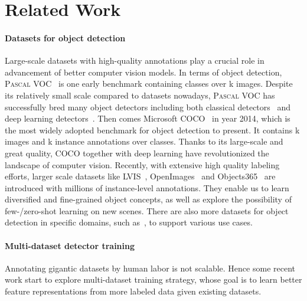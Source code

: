 \documentclass[10pt,twocolumn,letterpaper]{article}
\begin{document}
 
\section{Related Work}
\label{sec:related}
\paragraph{Datasets for object detection}
Large-scale datasets with high-quality annotations play a crucial role in advancement of better computer vision models. 
In terms of object detection, \textsc{Pascal} VOC~\cite{everingham2015pascal} is one early benchmark containing  classes over k images.
Despite its relatively small scale compared to datasets nowadays, \textsc{Pascal} VOC has successfully bred many object detectors including both classical detectors~\cite{felzenszwalb2009object, wang2013regionlets} and deep learning detectors~\cite{girshick2014rich, he2015spatial, girshick2015fast}. 
Then comes Microsoft COCO~\cite{lin2014microsoft} in year 2014, which is the most widely adopted benchmark for object detection to present.
It contains k images and k instance annotations over  classes.
Thanks to its large-scale and great quality, COCO together with deep learning have revolutionized the landscape of computer vision.
Recently, with extensive high quality labeling efforts, larger scale datasets like LVIS~\cite{gupta2019lvis}, OpenImages~\cite{kuznetsova2020open} and Objects365~\cite{shao2019objects365} are introduced with millions of instance-level annotations. 
They enable us to learn diversified and fine-grained object concepts, as well as explore the possibility of few-/zero-shot learning on new scenes. 
There are also more datasets for object detection in specific domains, such as~\cite{geiger2012we,cordts2016cityscapes,sun2020scalability,shao2018crowdhuman,real2017youtube,van2018inaturalist}, to support various use cases.

\paragraph{Multi-dataset detector training}
Annotating gigantic datasets by human labor is not scalable. Hence some recent work start to explore multi-dataset training strategy, whose goal is to learn better feature representations from more labeled data given existing datasets. 
\end{document}
